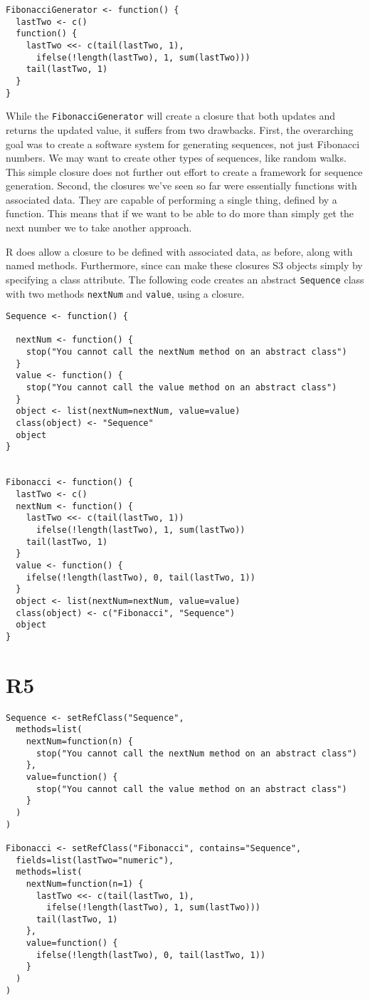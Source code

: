 \begin{verbatim}
FibonacciGenerator <- function() {
  lastTwo <- c()
  function() {
    lastTwo <<- c(tail(lastTwo, 1),
      ifelse(!length(lastTwo), 1, sum(lastTwo)))
    tail(lastTwo, 1)
  }
}
\end{verbatim}

While the \texttt{FibonacciGenerator} will create a closure that both
updates and returns the updated value, it suffers from two drawbacks.
First, the overarching goal was to create a software system for
generating sequences, not just Fibonacci numbers. We may want to create
other types of sequences, like random walks. This simple closure does
not further out effort to create a framework for sequence generation.
Second, the closures we've seen so far were essentially functions with
associated data. They are capable of performing a single thing, defined
by a function. This means that if we want to be able to do more than
simply get the next number we to take another approach.

R does allow a closure to be defined with associated data, as before,
along with named methods. Furthermore, since can make these closures S3
objects simply by specifying a class attribute. The following code
creates an abstract \texttt{Sequence} class with two methods
\texttt{nextNum} and \texttt{value}, using a closure.

\begin{verbatim}
Sequence <- function() {

  nextNum <- function() {
    stop("You cannot call the nextNum method on an abstract class")
  }
  value <- function() {
    stop("You cannot call the value method on an abstract class")
  }
  object <- list(nextNum=nextNum, value=value)
  class(object) <- "Sequence"
  object
}


Fibonacci <- function() {
  lastTwo <- c()
  nextNum <- function() {
    lastTwo <<- c(tail(lastTwo, 1))
      ifelse(!length(lastTwo), 1, sum(lastTwo))
    tail(lastTwo, 1)
  }
  value <- function() {
    ifelse(!length(lastTwo), 0, tail(lastTwo, 1))
  }
  object <- list(nextNum=nextNum, value=value)
  class(object) <- c("Fibonacci", "Sequence")
  object
}
\end{verbatim}

\section{R5}

\begin{verbatim}
Sequence <- setRefClass("Sequence",
  methods=list(
    nextNum=function(n) {
      stop("You cannot call the nextNum method on an abstract class")
    },
    value=function() {
      stop("You cannot call the value method on an abstract class")
    }
  )
)

Fibonacci <- setRefClass("Fibonacci", contains="Sequence",
  fields=list(lastTwo="numeric"),
  methods=list(
    nextNum=function(n=1) {
      lastTwo <<- c(tail(lastTwo, 1),
        ifelse(!length(lastTwo), 1, sum(lastTwo)))
      tail(lastTwo, 1)
    },
    value=function() {
      ifelse(!length(lastTwo), 0, tail(lastTwo, 1))
    }
  )
)
\end{verbatim}
